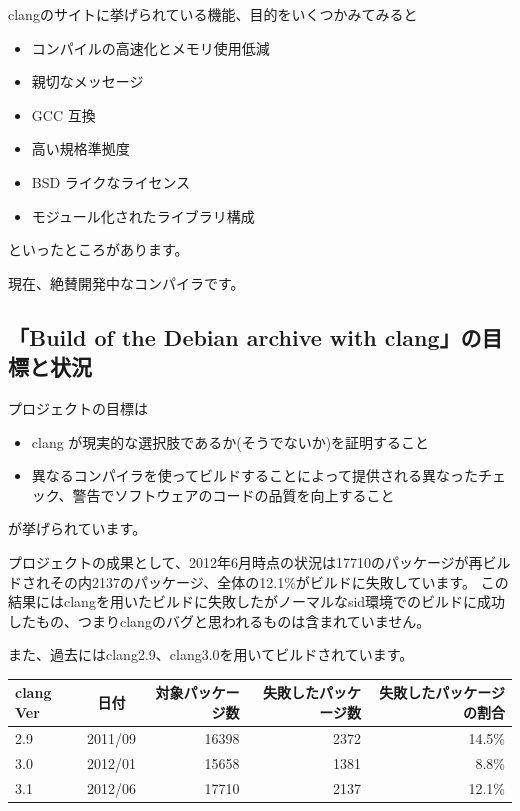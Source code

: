\documentclass[mingoth,a4paper]{jsarticle}
\begin{document}
clangのサイトに挙げられている機能、目的をいくつかみてみると

\begin{itemize}
\item コンパイルの高速化とメモリ使用低減
\item 親切なメッセージ
\item GCC 互換
\item 高い規格準拠度
\item BSD ライクなライセンス
\item モジュール化されたライブラリ構成
\end{itemize}

といったところがあります。

現在、絶賛開発中なコンパイラです。


\subsection{「Build of the Debian archive with clang」の目標と状況}

プロジェクトの目標は

\begin{itemize}
\item clang が現実的な選択肢であるか(そうでないか)を証明すること
\item 異なるコンパイラを使ってビルドすることによって提供される異なったチェック、警告でソフトウェアのコードの品質を向上すること
\end{itemize}

が挙げられています。

\clearpage

プロジェクトの成果として、2012年6月時点の状況は17710のパッケージが再ビルドされその内2137のパッケージ、全体の12.1\%がビルドに失敗しています。
この結果にはclangを用いたビルドに失敗したがノーマルなsid環境でのビルドに成功したもの、つまりclangのバグと思われるものは含まれていません。

また、過去にはclang2.9、clang3.0を用いてビルドされています。

\begin{table}[h]
  \begin{tabular}{|l|c|r|r|r|} \hline
    clang Ver & 日付 & 対象パッケージ数 & 失敗したパッケージ数 & 失敗したパッケージの割合\\
    \hline \hline
    2.9 & 2011/09 & 16398 & 2372 & 14.5\% \\
    3.0 & 2012/01 & 15658 & 1381 & 8.8\% \\
    3.1 & 2012/06 & 17710 & 2137 & 12.1\% \\
    \hline
  \end{tabular}
\end{table}
\end{document}
